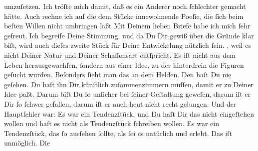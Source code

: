 \begin{ledgroupsized}[t]{13cm}
               umzuſetzen. Ich tröſte mich damit, daß es ein Anderer noch ſchlechter gemacht hätte.
                  {\pb}Auch rechne ich auf die dem Stücke innewohnende Poeſie, die ſich beim
               beſten Willen nicht umbringen läßt{\dotsfive}\pend
           \pstart
           Mit Deinem lieben Briefe habe ich mich ſehr gefreut. Ich begreife Deine Stimmung, und
               da Du Dir gewiß über die Gründe klar biſt, wird auch dieſes zweite Stück für Deine Entwickelung nützlich ſein.
                  \label{K_L02790-9v}\label{K_L02790-9h}, weil es nicht Deiner Natur und Deiner Schaffensart entſpricht. Es iſt nicht
               aus dem Leben herausgewachſen, ſondern aus einer Idee, zu der hinterdrein die Figuren
               geſucht wurden. Beſonders {\pb}ſieht man das an dem Helden. Den haſt Du nie
               geſehen. Du haſt ihn Dir künſtlich zuſammenzimmern müſſen, damit er zu Deiner Idee
               paßt. Darum biſt Du ſo unſicher bei ſeiner Geſtaltung geweſen, darum iſt er Dir ſo
               ſchwer gefallen, darum iſt er auch heut nicht recht gelungen. Und der Hauptfehler
               war: Es war ein Tendenzſtück, und Du haſt Dir das nicht eingeſtehen wollen und haſt
               es nicht als Tendenzſtück ſchreiben wollen. Es war ein Tendenzſtück, das ſo ausſehen
               ſollte, als ſei es natürlich {\pb}und erlebt. Das iſt
               unmöglich. Die \label{K_L02790-10v}\label{K_L02790-10h}

\end{ledgroupsized}
